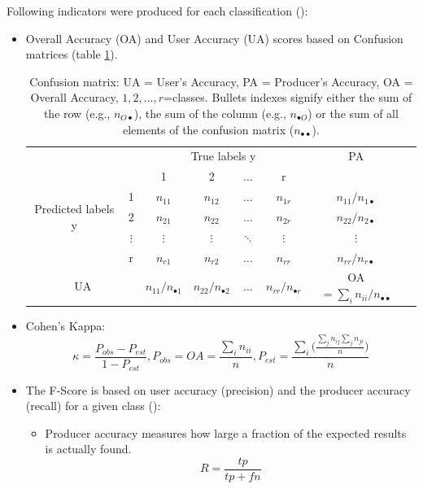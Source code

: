 \documentclass[10pt]{article}
\begin{document}
Following indicators were produced for each classification (\cite{deMorsier}):
\begin{itemize}
    \item Overall Accuracy (OA) and User Accuracy (UA) scores based on Confusion matrices (table \ref{table:cm}).
    \begin{table}[H]
		\centering
		\begin{tabular}{cc|c|c|c|c|cl}
			& & \multicolumn{4}{c|}{True labels y}&PA\\
			\multirow{5}{*}{Predicted labels y} &  & 1& 2& $\hdots$ &r  &\\ \cline{1-7} 
			& 1 &  $n_{11}$ & $n_{12}$ & $\hdots$ & $n_{1r}$& $n_{11}/n_{1\bullet}$ \\ \cline{2-7} 
			& 2 & $n_{21}$ & $n_{22}$ &$\hdots$  &$n_{2r}$ &$n_{22}/n_{2\bullet}$\\ \cline{2-7} 
			& $\vdots$ & $\vdots$ & $\vdots$ &$\ddots$  &$\vdots$&$\vdots$\\ \cline{2-7} 
			& r & $n_{r1}$ & $n_{r2}$ &$\hdots$  & $n_{rr}$ & $n_{rr}/n_{r\bullet}$ \\\cline{1-7} 
			\multicolumn{2}{c|}{UA} & $n_{11}/n_{\bullet 1}$ & $n_{22}/n_{\bullet 2}$ & $\hdots$ & $n_{rr}/n_{\bullet r}$ & OA$=\sum_in_{ii}/n_{\bullet\bullet}$\\
		\end{tabular}
		\caption{Confusion matrix: UA = User's Accuracy, PA = Producer's Accuracy, OA = Overall Accuracy, $1,2,\hdots,r$=classes. Bullets indexes signify either the sum of the row (e.g., $n_{O\bullet}$), the sum of the column (e.g., $n_{\bullet O}$) or the sum of all elements of the confusion matrix ($n_{\bullet\bullet}$).}
		\label{table:cm}
	\end{table}
	\item Cohen's Kappa:
	\begin{equation}
	    \kappa=\frac{P_{obs}-P_{est}}{1-P_{est}},P_{obs}=OA=\frac{\sum_in_{ii}}{n}, P_{est}=\frac{\sum_i\big(\frac{\sum_jn_{ij}\sum_jn_{ji}}{n}\big)}{n}
	\end{equation}
	\item The F-Score is based on user accuracy (precision) and the producer accuracy (recall) for a given class (\cite{zhang_f-measure_2009,ting_precision_2011}):
	\begin{itemize}
	    \item Producer accuracy measures how large a fraction of the expected results is actually found.
	    \begin{equation}
	        R=\frac{tp}{tp+fn}

\end{equation}
\end{itemize}
\end{itemize}
\end{document}
